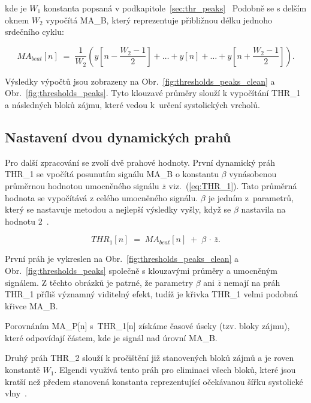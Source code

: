 kde je \(W_1\) konstanta popsaná v podkapitole~\ref{sec:thr_peaks}~\cite{Elgendi2013}
Podobně se s delším oknem \(W_2\) vypočítá \acs{MA_B}, který reprezentuje přibližnou délku jednoho srdečního cyklu:

\begin{equation}
	MA_{beat}[n] \;=\;
	\frac{1}{W_2}
	(y[n - \frac{W_2-1}{2}] + \ldots + y[n] + \ldots + y[n + \frac{W_2-1}{2}]).
	\label{eq:MA_B}
\end{equation}

Výsledky výpočtů jsou zobrazeny na Obr.~\ref{fig:thresholds_peaks_clean} a Obr.~\ref{fig:thresholds_peaks}.
Tyto klouzavé průměry slouží k vypočítání \acs{THR_1} a následných bloků zájmu, které vedou k~určení systolických vrcholů.

\subsection*{Nastavení dvou dynamických prahů}
\label{sec:thresholds}
% 
Pro další zpracování se zvolí dvě prahové hodnoty.
První dynamický práh \acs{THR_1} se vpočítá posunutím signálu \acs{MA_B} o konstantu \(\beta\) vynásobenou průměrnou hodnotou umocněného signálu \(\overline{z}\) viz.~(\ref{eq:THR_1}).
Tato průměrná hodnota se vypočítává z celého umocněného signálu.
\(\beta\) je jedním z~parametrů, který se nastavuje metodou  a nejlepší výsledky vyšly, když se \(\beta\) nastavila na hodnotu 2~\cite{Elgendi2013}.

\begin{equation}
	THR_1[n] \;=\; MA_{beat}[n] \;+\; \beta \,\cdot\, \overline{z}.
	\label{eq:THR_1}
\end{equation}

První práh je vykreslen na Obr.~\ref{fig:thresholds_peaks_clean} a Obr.~\ref{fig:thresholds_peaks} společně s klouzavými průměry a umocněným signálem.
Z těchto obrázků je patrné, že parametry \(\beta\) ani \(\overline{z}\) nemají na práh \acs{THR_1} příliš významný viditelný efekt, tudíž je křivka \acs{THR_1} velmi podobná křivce \acs{MA_B}.

Porovnáním \acs{MA_P}[n] s~\acs{THR_1}[n] získáme časové úseky (tzv. bloky zájmu), které odpovídají částem, kde je signál nad úrovní \acs{MA_B}.

Druhý práh \acs{THR_2} slouží k pročištění již stanovených bloků zájmů a je roven konstantě \(W_1\).
Elgendi využívá tento práh pro eliminaci všech bloků, které jsou kratší než předem stanovená konstanta reprezentující očekávanou šířku systolické vlny~\cite{Elgendi2013}.


